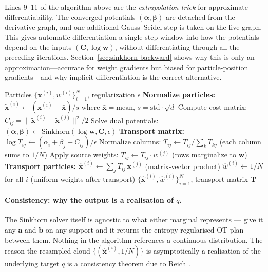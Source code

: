 \documentclass{article}
\begin{document}
Lines 9--11 of the algorithm above are the \emph{extrapolation trick} for approximate differentiability. The converged potentials $(\boldsymbol{\alpha}, \boldsymbol{\beta})$ are detached from the derivative graph, and one additional Gauss--Seidel step is taken on the live graph. This gives automatic differentiation a single-step window into how the potentials depend on the inputs $(\mathbf{C}, \log\mathbf{w})$, without differentiating through all the preceding iterations. Section~\ref{sec:sinkhorn-backward} shows why this is only an approximation---accurate for weight gradients but biased for particle-position gradients---and why implicit differentiation is the correct alternative.

\begin{algorithm}[H]
\caption{Entropy-Regularized Optimal Transport Resampling}
\begin{algorithmic}[1]
\REQUIRE Particles $\{\mathbf{x}^{(i)}, w^{(i)}\}_{i=1}^N$, regularization $\epsilon$
\STATE \textbf{Normalize particles:} $\tilde{\mathbf{x}}^{(i)} \leftarrow (\mathbf{x}^{(i)} - \bar{\mathbf{x}}) / s$ where $\bar{\mathbf{x}} = \text{mean}$, $s = \text{std}\cdot\sqrt{d}$
\STATE Compute cost matrix: $C_{ij} = \|\tilde{\mathbf{x}}^{(i)} - \tilde{\mathbf{x}}^{(j)}\|^2 / 2$
\STATE Solve dual potentials: $(\boldsymbol{\alpha}, \boldsymbol{\beta}) \leftarrow \text{Sinkhorn}(\log\mathbf{w}, \mathbf{C}, \epsilon)$
\STATE \textbf{Transport matrix:}
\STATE $\log T_{ij} \leftarrow (\alpha_i + \beta_j - C_{ij})/\epsilon$
\STATE Normalize columns: $T_{ij} \leftarrow T_{ij} / \sum_k T_{kj}$ \hfill (each column sums to $1/N$)
\STATE Apply source weights: $T_{ij} \leftarrow T_{ij} \cdot w^{(j)}$ \hfill (rows marginalize to $\mathbf{w}$)
\STATE \textbf{Transport particles:}
\STATE $\hat{\mathbf{x}}^{(i)} \leftarrow \sum_j T_{ij}\, \mathbf{x}^{(j)}$ \hfill (matrix-vector product)
\STATE $\hat{w}^{(i)} \leftarrow 1/N$ for all $i$ \hfill (uniform weights after transport)
\RETURN $\{\hat{\mathbf{x}}^{(i)}, \hat{w}^{(i)}\}_{i=1}^N$, transport matrix $\mathbf{T}$
\end{algorithmic}
\end{algorithm}

\paragraph{Consistency: why the output is a realisation of $q$.}
The Sinkhorn solver itself is agnostic to what either marginal represents --- give it any $\mathbf{a}$ and $\mathbf{b}$ on any support and it returns the entropy-regularised OT plan between them. Nothing in the algorithm references a continuous distribution. The reason the resampled cloud $\{(\hat{\mathbf{x}}^{(i)}, 1/N)\}$ is asymptotically a realisation of the underlying target $q$ is a consistency theorem due to Reich \cite{reich2013nonparametric}.
\end{document}
